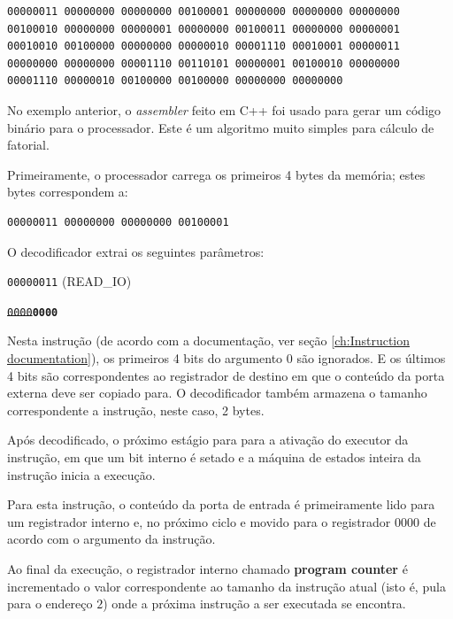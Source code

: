 \documentclass[11pt]{report}
\begin{document}
\begin{lstlisting}[breakatwhitespace=true,breakindent=0em,breaklines=true]
00000011 00000000 00000000 00100001 00000000 00000000 00000000 00100010 00000000 00000001 00000000 00100011 00000000 00000001 00010010 00100000 00000000 00000010 00001110 00010001 00000011 00000000 00000000 00001110 00110101 00000001 00100010 00000000 00001110 00000010 00100000 00100000 00000000 00000000 
\end{lstlisting}

No exemplo anterior, o \emph{assembler} feito em C++ foi usado para gerar um código binário para o processador. Este é um algoritmo muito simples para cálculo de fatorial.

Primeiramente, o processador carrega os primeiros 4 bytes da memória; estes bytes correspondem a:

\begin{lstlisting}
00000011 00000000 00000000 00100001
\end{lstlisting}

O decodificador extrai os seguintes parâmetros:
\begin{description}[style=multiline,topsep=10pt,leftmargin=5cm]
	\item[Opcode] \texttt{00000011} (READ\_IO)
	\item[Argumento 0] \texttt{\st{0000}\textbf{0000}}
\end{description}

Nesta instrução (de acordo com a documentação, ver seção \ref{ch:Instruction documentation}), os primeiros 4 bits do argumento 0 são ignorados. E os últimos 4 bits são correspondentes ao registrador de destino em que o conteúdo da porta externa deve ser copiado para. O decodificador também armazena o tamanho correspondente a instrução, neste caso, 2 bytes.

Após decodificado, o próximo estágio para para a ativação do executor da instrução, em que um bit interno é setado e a máquina de estados inteira da instrução inicia a execução.

Para esta instrução, o conteúdo da porta de entrada é primeiramente lido para um registrador interno e, no próximo ciclo e movido para o registrador 0000 de acordo com o argumento da instrução.

Ao final da execução, o registrador interno chamado \textbf{program counter} é incrementado o valor correspondente ao tamanho da instrução atual (isto é, pula para o endereço $2$) onde a próxima instrução a ser executada se encontra.
\end{document}
